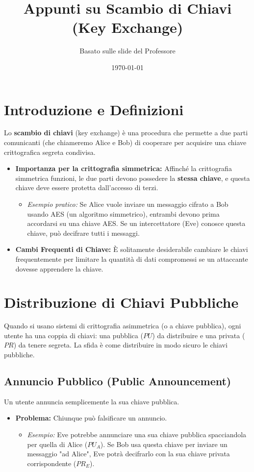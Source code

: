 \documentclass{article}
\title{Appunti su Scambio di Chiavi (Key Exchange)}
\author{Basato sulle slide del Professore}
\date{\today}
\begin{document}
\maketitle
\tableofcontents
\newpage

\section{Introduzione e Definizioni}

Lo \textbf{scambio di chiavi} (key exchange) è una procedura che permette a due parti comunicanti (che chiameremo Alice e Bob) di cooperare per acquisire una chiave crittografica segreta condivisa.

\begin{itemize}
    \item \textbf{Importanza per la crittografia simmetrica:} Affinché la crittografia simmetrica funzioni, le due parti devono possedere la \textbf{stessa chiave}, e questa chiave deve essere protetta dall'accesso di terzi.
        \begin{itemize}
            \item \textit{Esempio pratico:} Se Alice vuole inviare un messaggio cifrato a Bob usando AES (un algoritmo simmetrico), entrambi devono prima accordarsi su una chiave AES. Se un intercettatore (Eve) conosce questa chiave, può decifrare tutti i messaggi.
        \end{itemize}
    \item \textbf{Cambi Frequenti di Chiave:} È solitamente desiderabile cambiare le chiavi frequentemente per limitare la quantità di dati compromessi se un attaccante dovesse apprendere la chiave.
\end{itemize}

\section{Distribuzione di Chiavi Pubbliche}
Quando si usano sistemi di crittografia asimmetrica (o a chiave pubblica), ogni utente ha una coppia di chiavi: una pubblica ($PU$) da distribuire e una privata ($PR$) da tenere segreta. La sfida è come distribuire in modo sicuro le chiavi pubbliche.

\subsection{Annuncio Pubblico (Public Announcement)}
Un utente annuncia semplicemente la sua chiave pubblica.
\begin{itemize}
    \item \textbf{Problema:} Chiunque può falsificare un annuncio.
        \begin{itemize}
            \item \textit{Esempio:} Eve potrebbe annunciare una sua chiave pubblica spacciandola per quella di Alice ($PU_A$). Se Bob usa questa chiave per inviare un messaggio "ad Alice", Eve potrà decifrarlo con la sua chiave privata corrispondente ($PR_E$).
        \end{itemize}
\end{itemize}
\end{document}
